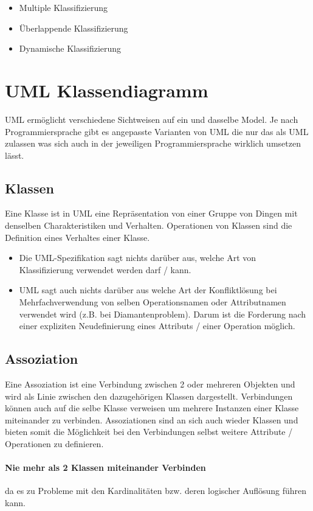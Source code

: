 \begin{itemize}
	\item Multiple Klassifizierung
	\item Überlappende Klassifizierung
	\item Dynamische Klassifizierung
\end{itemize}

\section{UML Klassendiagramm}
UML ermöglicht verschiedene Sichtweisen auf ein und dasselbe Model. Je nach Programmiersprache gibt es angepasste Varianten von UML die nur das als UML zulassen was sich auch in der jeweiligen Programmiersprache wirklich umsetzen lässt.

\subsection{Klassen}
Eine Klasse ist in UML eine Repräsentation von einer Gruppe von Dingen mit denselben Charakteristiken und Verhalten. Operationen von Klassen sind die Definition eines Verhaltes einer Klasse.

\begin{itemize}
	\item Die UML-Spezifikation sagt nichts darüber aus, welche Art von Klassifizierung verwendet werden darf / kann.
	\item UML sagt auch nichts darüber aus welche Art der Konfliktlösung bei Mehrfachverwendung von selben Operationsnamen oder Attributnamen verwendet wird (z.B. bei Diamantenproblem). Darum ist die Forderung nach einer expliziten Neudefinierung eines Attributs / einer Operation möglich.
\end{itemize}

\subsection{Assoziation}
Eine Assoziation ist eine Verbindung zwischen 2 oder mehreren Objekten und wird als Linie zwischen den dazugehörigen Klassen dargestellt. Verbindungen können auch auf die selbe Klasse verweisen um mehrere Instanzen einer Klasse miteinander zu verbinden. Assoziationen sind an sich auch wieder Klassen und bieten somit die Möglichkeit bei den Verbindungen selbst weitere Attribute / Operationen zu definieren.

\paragraph{Nie mehr als 2 Klassen miteinander Verbinden} da es zu Probleme mit den Kardinalitäten bzw. deren logischer Auflösung führen kann.


